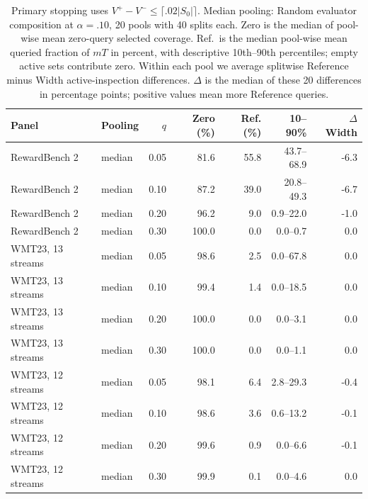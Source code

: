 \begin{table}[t]
\centering\small
\begin{tabular}{llrrrrr}
\toprule
Panel & Pooling & $q$ & Zero (\%) & Ref. (\%) & 10--90\% & $\Delta$ Width \\
\midrule
RewardBench 2 & median & 0.05 & 81.6 & 55.8 & 43.7--68.9 & -6.3 \\
RewardBench 2 & median & 0.10 & 87.2 & 39.0 & 20.8--49.3 & -6.7 \\
RewardBench 2 & median & 0.20 & 96.2 & 9.0 & 0.9--22.0 & -1.0 \\
RewardBench 2 & median & 0.30 & 100.0 & 0.0 & 0.0--0.7 & 0.0 \\
WMT23, 13 streams & median & 0.05 & 98.6 & 2.5 & 0.0--67.8 & 0.0 \\
WMT23, 13 streams & median & 0.10 & 99.4 & 1.4 & 0.0--18.5 & 0.0 \\
WMT23, 13 streams & median & 0.20 & 100.0 & 0.0 & 0.0--3.1 & 0.0 \\
WMT23, 13 streams & median & 0.30 & 100.0 & 0.0 & 0.0--1.1 & 0.0 \\
WMT23, 12 streams & median & 0.05 & 98.1 & 6.4 & 2.8--29.3 & -0.4 \\
WMT23, 12 streams & median & 0.10 & 98.6 & 3.6 & 0.6--13.2 & -0.1 \\
WMT23, 12 streams & median & 0.20 & 99.6 & 0.9 & 0.0--6.6 & -0.1 \\
WMT23, 12 streams & median & 0.30 & 99.9 & 0.1 & 0.0--4.6 & 0.0 \\
\bottomrule
\end{tabular}
\caption{Primary stopping uses $V^+-V^-\le\lceil.02|S_0|\rceil$. Median pooling: Random evaluator composition at $\alpha=.10$, 20 pools with 40 splits each. Zero is the median of pool-wise mean zero-query selected coverage. Ref.\ is the median pool-wise mean queried fraction of $mT$ in percent, with descriptive 10th--90th percentiles; empty active sets contribute zero. Within each pool we average splitwise Reference minus Width active-inspection differences. $\Delta$ is the median of these 20 differences in percentage points; positive values mean more Reference queries.}
\label{tab:review-composition-median}
\end{table}
